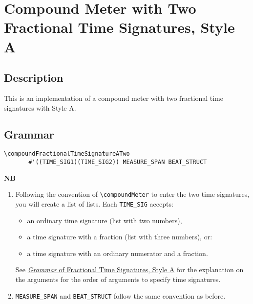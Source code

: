


\section {Compound Meter with Two Fractional Time Signatures, Style A}

\hfill
{}
\hfill

\subsection{Description}
This is an implementation of a compound meter with two fractional time signatures with Style A.  

\subsection{Grammar}
\begin{verbatim}
\compoundFractionalTimeSignatureATwo
       #'((TIME_SIG1)(TIME_SIG2)) MEASURE_SPAN BEAT_STRUCT
\end{verbatim}
\textbf{NB} 
\begin{enumerate}
\item Following the convention of \verb|\compoundMeter| to enter the two time signatures, you will create a list of lists. Each \verb|TIME_SIG| accepts:\\
\begin{itemize} 
\item an ordinary time signature (list with two numbers), 
\item a time signature with a fraction (list with three numbers), or:
\item a time signature with an ordinary numerator and a fraction.
\end{itemize} 
See \hyperref[sec:time_signatures_styleA_convention]{\textit{Grammar} of Fractional Time Signatures, Style A} for the explanation on the arguments for the order of arguments to specify time signatures.
\item \verb|MEASURE_SPAN| and \verb|BEAT_STRUCT| follow the same convention as before.
\end{enumerate}
